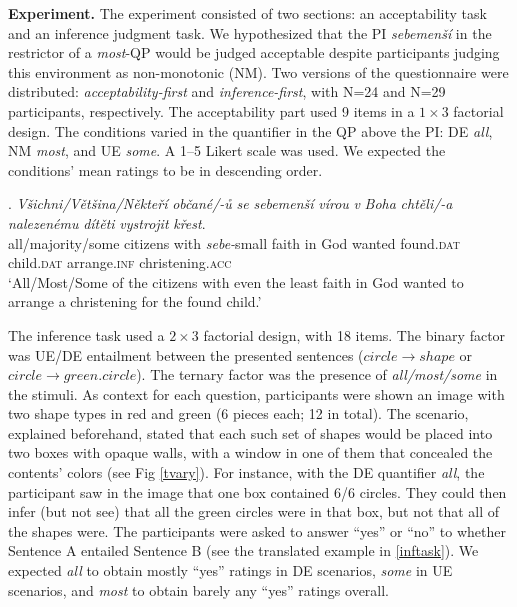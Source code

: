 \documentclass[12pt, a4]{article}
\begin{document}
\noindent \textbf{Experiment.} \noindent The experiment consisted of two sections: an acceptability task and an inference judgment task. We hypothesized that the PI \textit{sebemenší} in the restrictor of a \textit{most}-QP would be judged acceptable despite participants judging this environment as non-monotonic (NM). Two versions of the questionnaire were distributed: \textit{acceptability-first} and \textit{inference-first}, with N=24 and N=29 participants, respectively. The acceptability part used 9 items in a $1\times3$ factorial design. The conditions varied in the quantifier in the QP above the PI: DE \textit{all}, NM \textit{most}, and UE \textit{some}. A 1--5 Likert scale was used. We expected the conditions' mean ratings to be in descending order.\vspace{-3mm}

\exg. \textit{Všichni/Většina/Někteří} \textit{občané/-ů} \textit{se} \textit{sebemenší} \textit{vírou} \textit{v} \textit{Boha} \textit{chtěli/-a} \textit{nalezenému} \textit{dítěti} \textit{vystrojit} \textit{křest}.\label{dite}\\
all/majority/some citizens with \textit{sebe-}small faith in God wanted found.\textsc{dat} child.\textsc{dat} arrange.\textsc{inf} christening.\textsc{acc}\\
\small ‘All/Most/Some of the citizens with even the least faith in God wanted to arrange a christening for the found child.’\vspace{-3mm}

\noindent The inference task used a $2\times3$ factorial design, with 18 items. The binary factor was UE/DE entailment between the presented sentences ($circle\rightarrow shape$ or $circle\rightarrow green.circle$). The ternary factor was the presence of \textit{all/most/some} in the stimuli. As context for each question, participants were shown an image with two shape types in red and green (6 pieces each; 12 in total). The scenario, explained beforehand, stated that each such set of shapes would be placed into two boxes with opaque walls, with a window in one of them that concealed the contents' colors (see Fig \ref{tvary}). For instance, with the DE quantifier \textit{all}, the participant saw in the image that one box contained 6/6 circles. They could then infer (but not see) that all the green circles were in that box, but not that all of the shapes were. The participants were asked to answer “yes” or “no” to whether Sentence A entailed Sentence B (see the translated example in \ref{inftask}). We expected \textit{all} to obtain mostly “yes” ratings in DE scenarios, \textit{some} in UE scenarios, and \textit{most} to obtain barely any “yes” ratings overall.\vspace{-2mm}
\end{document}
